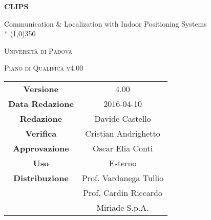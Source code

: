 \documentclass[a4paper,12pt]{article}
\author{Andrighetto Cristian, Castello Davide}
\date{27/12/2015}
\begin{document}
	\begin{titlepage}
		\centering
	{\huge\bfseries CLIPS\par}
	Communication \& Localization with Indoor Positioning Systems \\*
	\line(1,0){350} \\
	{\scshape\LARGE Università di Padova \par}
	\vspace{1cm}
	{\scshape\Large Piano di Qualifica v4.00 \par}
	\logo
	\newpage
		\begin{tabular}{c|c}
			{\hfill \textbf{Versione}} 			& 4.00 				\\
			{\hfill\textbf{Data Redazione}} 		& 2016-04-10	 		\\ 
			{\hfill\textbf{Redazione}} 			& Davide Castello 		\\ 
			{\hfill\textbf{Verifica}} 			& Cristian Andrighetto 		\\
			{\hfill\textbf{Approvazione}} 			& Oscar Elia Conti 		\\
			{\hfill\textbf{Uso}} 				& Esterno			\\
			{\hfill\textbf{Distribuzione}} 			& Prof. Vardanega Tullio	\\
									& Prof. Cardin Riccardo 	\\
									& Miriade S.p.A.
		\end{tabular}
	\end{titlepage}
	
	\newpage
	\pagestyle{myfront}
		
	
	\newpage
		\tableofcontents
	
	\newpage
		\listoftables
	
	\label{LastFrontPage}
	\newpage
		\pagestyle{mymain}
	
\newpage
	
\newpage
	
\newpage
	
\newpage
	
\newpage
	
\newpage
	
\newpage
	
\newpage
	
\newpage
	
\newpage
	
\label{LastPage}
\end{document}
